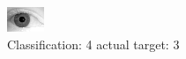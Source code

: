\begin{figure}[h!]
\begin{center}
\includegraphics[width=0.60\columnwidth]{figures/ID2187_class_4_target_3.png}
\end{center}
\caption{ Classification: 4 actual target: 3}
\label{fig:ID2187_class_4_target_3}
\end{figure}
